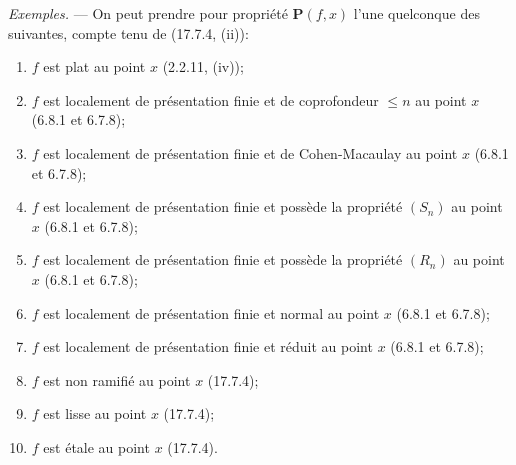 \begin{env}[18.4.11]
\label{IV.18.4.11}
\emph{Exemples.} --- On peut prendre pour propriété $\mathbf P(f,x)$ l'une quelconque des suivantes, compte tenu de (17.7.4, (ii)):
\begin{enumerate}
  \item[(i)] $f$ est plat au point $x$ (2.2.11, (iv));
  \item[(ii)] $f$ est localement de présentation finie et de coprofondeur $\leq n$ au point $x$ (6.8.1 et 6.7.8);
  \item[(iii)] $f$ est localement de présentation finie et de Cohen-Macaulay au point $x$ (6.8.1 et 6.7.8);
  \item[(iv)] $f$ est localement de présentation finie et possède la propriété $(S_n)$ au point $x$ (6.8.1 et 6.7.8);
  \item[(v)] $f$ est localement de présentation finie et possède la propriété $(R_n)$ au point $x$ (6.8.1 et 6.7.8);
  \item[(vi)] $f$ est localement de présentation finie et normal au point $x$ (6.8.1 et 6.7.8);
  \item[(vii)] $f$ est localement de présentation finie et réduit au point $x$ (6.8.1 et 6.7.8);
  \item[(viii)] $f$ est non ramifié au point $x$ (17.7.4);
  \item[(ix)] $f$ est lisse au point $x$ (17.7.4);
  \item[(x)] $f$ est étale au point $x$ (17.7.4).
\end{enumerate}
\end{env}

